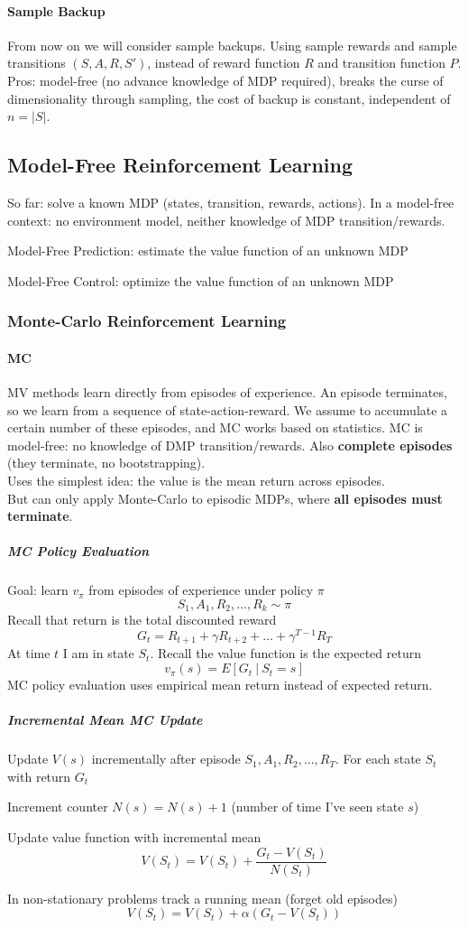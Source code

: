 \documentclass[10pt]{report}
\begin{document}
\paragraph{Sample Backup} From now on we will consider sample backups. Using sample rewards and sample transitions $(S,A,R,S')$, instead of reward function $R$ and transition function $P$.\\
Pros: model-free (no advance knowledge of MDP required), breaks the curse of dimensionality through sampling, the cost of backup is constant, independent of $n = |S|$.
\subsection{Model-Free Reinforcement Learning}
So far: solve a known MDP (states, transition, rewards, actions). In a model-free context: no environment model, neither knowledge of MDP transition/rewards.
\begin{list}{}{}
	\item Model-Free Prediction: estimate the value function of an unknown MDP
	\item Model-Free Control: optimize the value function of an unknown MDP
\end{list}
\subsubsection{Monte-Carlo Reinforcement Learning}
\paragraph{MC} MV methods learn directly from episodes of experience. An episode terminates, so we learn from a sequence of state-action-reward. We assume to accumulate a certain number of these episodes, and MC works based on statistics. MC is model-free: no knowledge of DMP transition/rewards. Also \textbf{complete episodes} (they terminate, no bootstrapping).\\
Uses the simplest idea: the value is the mean return across episodes.\\
But can only apply Monte-Carlo to episodic MDPs, where \textbf{all episodes must terminate}.
\subparagraph{MC Policy Evaluation} Goal: learn $v_\pi$ from episodes of experience under policy $\pi$
$$S_1,A_1,R_2,\ldots,R_k\sim \pi$$
Recall that return is the total discounted reward
$$G_t = R_{t+1} + \gamma R_{t+2} + \ldots + \gamma^{T-1}R_T$$
At time $t$ I am in state $S_t$. Recall the value function is the expected return $$v_\pi(s)=E[G_t\:|\:S_t=s]$$
MC policy evaluation uses empirical mean return instead of expected return.
\subparagraph{Incremental Mean MC Update} Update $V(s)$ incrementally after episode $S_1,A_1,R_2,\ldots, R_T$. For each state $S_t$ with return $G_t$\begin{list}{}{}
	\item Increment counter $N(s) = N(s) + 1$ (number of time I've seen state $s$)
	\item Update value function with incremental mean
	$$V(S_t) = V(S_t) + \frac{G_t - V(S_t)}{N(S_t)}$$
\end{list}
In non-stationary problems track a running mean (forget old episodes)
$$V(S_t) = V(S_t) +\alpha(G_t-V(S_t))$$
\end{document}
